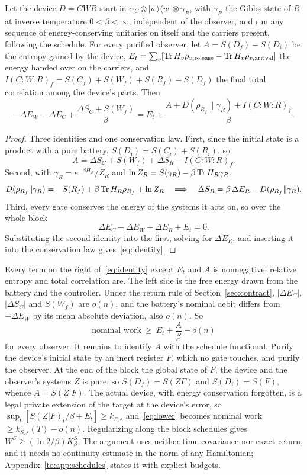 \begin{lemma}\label{lem:identity}
Let the device $D=CWR$ start in $\alpha_C\otimes|w\rangle\langle w|\otimes\gamma_R$, with $\gamma_R$ the Gibbs state of $R$ at inverse temperature $0<\beta<\infty$, independent of the observer, and run any sequence of energy-conserving unitaries on itself and the carriers present, following the schedule. For every purified observer, let $A=S(D_f)-S(D_i)$ be the entropy gained by the device, $E_t=\sum_v[\operatorname{Tr} H_v\rho_{v,\mathrm{release}}-\operatorname{Tr} H_v\rho_{v,\mathrm{arrival}}]$ the energy handed over on the carriers, and $I(C{:}W{:}R)_f=S(C_f)+S(W_f)+S(R_f)-S(D_f)$ the final total correlation among the device's parts. Then
\begin{equation}\label{eq:identity}
-\Delta E_W-\Delta E_C+\frac{\Delta S_C+S(W_f)}{\beta}
=E_t+\frac{A+D(\rho_{R_f}\|\gamma_R)+I(C{:}W{:}R)_f}{\beta}.
\end{equation}
\end{lemma}
\begin{proof}
Three identities and one conservation law. First, since the initial state is a product with a pure battery, $S(D_i)=S(C_i)+S(R_i)$, so
\[
A=\Delta S_C+S(W_f)+\Delta S_R-I(C{:}W{:}R)_f .
\]
Second, with $\gamma_R=e^{-\beta H_R}/Z_R$ and $\ln Z_R=S(\gamma_R)-\beta\operatorname{Tr} H_R\gamma_R$,
\[
D(\rho_{R_f}\|\gamma_R)=-S(R_f)+\beta\operatorname{Tr} H_R\rho_{R_f}+\ln Z_R
\quad\Longrightarrow\quad
\Delta S_R=\beta\,\Delta E_R-D(\rho_{R_f}\|\gamma_R).
\]
Third, every gate conserves the energy of the systems it acts on, so over the whole block
\[
\Delta E_C+\Delta E_W+\Delta E_R+E_t=0 .
\]
Substituting the second identity into the first, solving for $\Delta E_R$, and inserting it into the conservation law gives~\eqref{eq:identity}.
\end{proof}

Every term on the right of~\eqref{eq:identity} except $E_t$ and $A$ is nonnegative: relative entropy and total correlation are. The left side is the free energy drawn from the battery and the controller. Under the return rule of Section~\ref{sec:contract}, $|\Delta E_C|$, $|\Delta S_C|$ and $S(W_f)$ are $o(n)$, and the battery's nominal debit differs from $-\Delta E_W$ by its mean absolute deviation, also $o(n)$. So
\begin{equation}\label{eq:lower}
\text{nominal work}\ \ge\ E_t+\frac{A}{\beta}-o(n)
\end{equation}
for every observer. It remains to identify $A$ with the schedule functional. Purify the device's initial state by an inert register $F$, which no gate touches, and purify the observer. At the end of the block the global state of $F$, the device and the observer's systems $Z$ is pure, so $S(D_f)=S(ZF)$ and $S(D_i)=S(F)$, whence $A=S(Z|F)$. The actual device, with energy conservation forgotten, is a legal private extension of the target at the device's error, so $\sup_t[S(Z|F)_t/\beta+E_t]\ge k_{S,\varepsilon}$ and~\eqref{eq:lower} becomes nominal work $\ge k_{S,\varepsilon}(T)-o(n)$. Regularizing along the block schedules gives $W^S\ge(\ln2/\beta)K_\beta^S$. The argument uses neither time covariance nor exact return, and it needs no continuity estimate in the norm of any Hamiltonian; Appendix~\ref{to:app:schedules} states it with explicit budgets.


